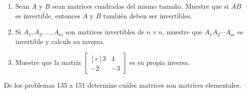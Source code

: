 \newpage
\begin{enumerate}[start=132]
    \item Sean $A$ y $B$ sean matrices cuadradas del mismo tamaño. Muestre que si $AB$ es invertible, entonces $A$ y $B$ también deben ser invertibles.\label{ejercicioABinvAyBinv}
    \item Si $A_1, A_2, \dots, A_m$ son matrices invertibles de $n \times n$, muestre que $A_1 A_2 \cdots A_m$ es invertible y calcule su inversa.
    \item Muestre que la matriz $\begin{bmatrix*}[r]3 & 4 \\ -2 & -3\end{bmatrix*}$ es su propia inversa.
\end{enumerate}
De los problemas 135 a 151 determine cuáles matrices son matrices elementales.
